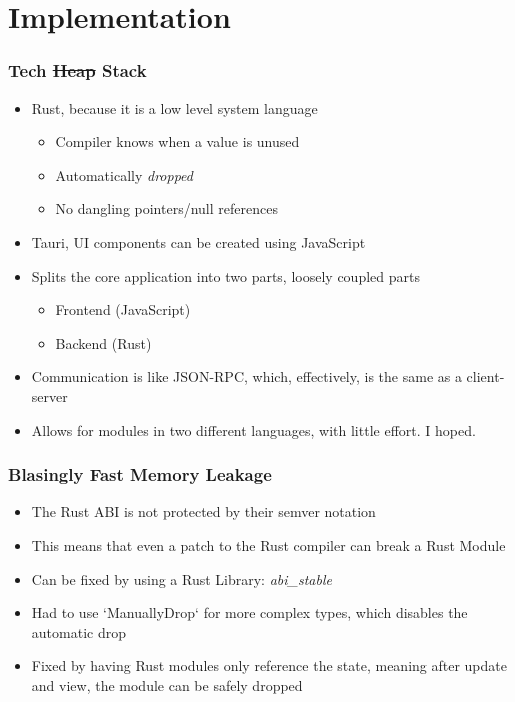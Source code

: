 \section{Implementation}
\SectionPage

\begin{frame}
  \frametitle{Tech \sout{Heap} Stack}
  \begin{itemize}
    \item Rust, because it is a low level system language
    \pause
      \begin{itemize}
        \item Compiler knows when a value is unused
        \pause
        \item Automatically \textit{dropped}
        \pause
        \item No dangling pointers/null references
      \end{itemize}
    \pause
    \item Tauri, UI components can be created using JavaScript
    \pause
    \item Splits the core application into two parts, loosely coupled parts
      \begin{itemize}
        \item Frontend (JavaScript)
        \pause
        \item Backend (Rust)
      \end{itemize}
    \pause
    \item Communication is like JSON-RPC, which, effectively, is the same as a
      client-server
    \pause
    \item Allows for modules in two different languages, with little effort.
      I hoped.
  \end{itemize}
\end{frame}

\begin{frame}
  \frametitle{Blasingly Fast Memory Leakage}
  \begin{itemize}
    \item The Rust ABI is not protected by their semver notation
    \pause
    \item This means that even a patch to the Rust compiler can break a
      Rust Module
    \pause
    \item Can be fixed by using a Rust Library: \textit{abi\_stable}
    \pause
    \item Had to use `ManuallyDrop` for more complex types, which disables
      the automatic drop
    \pause
    \item Fixed by having Rust modules only reference the state, meaning
      after update and view, the module can be safely dropped
    \pause
  \end{itemize}
\end{frame}

